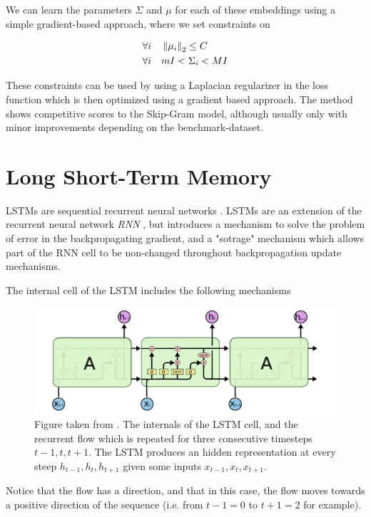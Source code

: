 \documentclass[a4paper,12pt,oneside,openright]{report}
\begin{document}
We can learn the parameters $\Sigma$ and $\mu$ for each of these embeddings using a simple gradient-based approach, where we set constraints on 

\begin{align}
\forall i \quad & \left\lVert \mu_i \right\rVert_2  \leq C\\
\forall i \quad & m I <  \Sigma_i < M I
\end{align}

These constraints can be used by using a Laplacian regularizer in the loss function which is then optimized using a gradient based approach. 
The method shows competitive scores to the Skip-Gram model, although usually only with minor improvements depending on the benchmark-dataset.

\section{Long Short-Term Memory}\label{appendix:LSTM}

LSTMs are sequential recurrent neural networks \cite{hochreiter97}.
LSTMs are an extension of the recurrent neural network \textit{RNN} \cite{rumelhart85}, but introduces a mechanism to solve the problem of error in the backpropagating gradient, and a "sotrage" mechanism which allows part of the RNN cell to be non-changed throughout backpropagation update mechanisms.

The internal cell of the LSTM includes the following mechanisms

\begin{figure}[h]
	\center
  \includegraphics[width=\linewidth]{./assets/background/LSTM.png}
  \caption{Figure taken from \cite{colahLSTM}. The internals of the LSTM cell, and the recurrent flow which is repeated for three consecutive timesteps $t-1, t, t+1$. 
  The LSTM produces an hidden representation at every steep $h_{t-1}, h_{t}, h_{t+1}$ given some inputs $x_{t-1}, x_t, x_{t+1}$.
  }
  \label{fig:lstm_internals}
\end{figure}

Notice that the flow has a direction, and that in this case, the flow moves towards a positive direction of the sequence (i.e. from $t-1 = 0$ to $t + 1 = 2$ for example).
\end{document}
